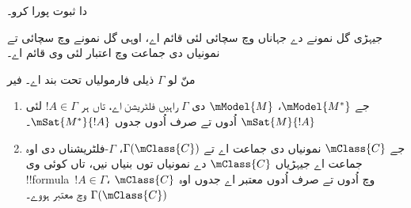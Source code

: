 \documentclass[../../../include/open-logic-section]{subfiles}
\begin{document}
\begin{prob}
   دا ثبوت پورا کرو۔
\end{prob}

جیہڑی گل نمونے دے جہاناں وچ سچائی لئی قائم اے، اوہی گل نمونے وچ سچائی تے نمونیاں دی جماعت وچ اعتبار لئی وی قائم اے۔

\begin{cor}
  منّ لو $\Gamma$ ذیلی فارمولیاں تحت بند اے۔ فیر
  \begin{enumerate}
  \item جے $\mModel{M^*}$، $\mModel{M}$ دی
    $\Gamma$ راہیں فلٹریشن اے، تاں ہر $!A \in \Gamma$ لئی $\mSat{M}{!A}$ اُدوں تے صرف اُدوں جدوں $\mSat{M^*}{!A}$۔
  \item جے $\mClass{C}$ نمونیاں دی جماعت اے تے $\Gamma(\mClass{C})$،
    $\Gamma$-فلٹریشناں دی اوہ جماعت اے جیہڑیاں $\mClass{C}$ دے نمونیاں توں بنیاں نیں، تاں کوئی وی !!{formula}~$!A \in \Gamma$، $\mClass{C}$ وچ اُدوں تے صرف اُدوں معتبر اے جدوں اوہ $\Gamma(\mClass{C})$ وچ معتبر ہووے۔
  \end{enumerate}
\end{cor}
\end{document}
